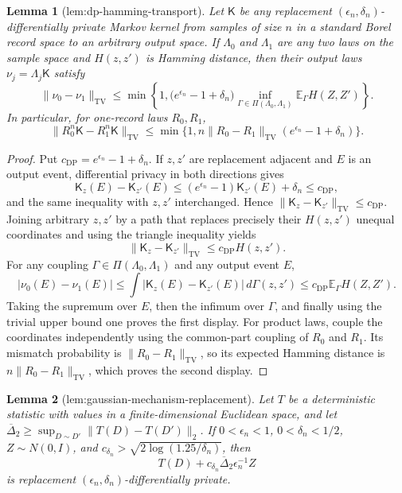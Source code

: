 \documentclass{article}
\newtheorem{lemma}{Lemma}
\begin{document}
\begin{lemma}[lem:dp-hamming-transport]\label{lem:dp-hamming-transport}
Let \(\mathsf K\) be any replacement \((\epsilon_n,\delta_n)\)-differentially private Markov kernel from samples of size \(n\) in a standard Borel record space to an arbitrary output space.  If \(\Lambda_0\) and \(\Lambda_1\) are any two laws on the sample space and \(H(z,z')\) is Hamming distance, then their output laws \(\nu_j=\Lambda_j\mathsf K\) satisfy
\[
 \|\nu_0-\nu_1\|_{\mathrm{TV}}
 \le \min\!\left\{1,\bigl(e^{\epsilon_n}-1+\delta_n\bigr)
 \inf_{\Gamma\in\Pi(\Lambda_0,\Lambda_1)}\mathbb E_\Gamma H(Z,Z')\right\}.
\]
In particular, for one-record laws \(R_0,R_1\),
\[
 \|R_0^n\mathsf K-R_1^n\mathsf K\|_{\mathrm{TV}}
 \le \min\{1,n\|R_0-R_1\|_{\mathrm{TV}}(e^{\epsilon_n}-1+\delta_n)\}.
\]
\end{lemma}
\begin{proof}
Put \(c_{\mathrm{DP}}=e^{\epsilon_n}-1+\delta_n\).  If \(z,z'\) are replacement adjacent and \(E\) is an output event, differential privacy in both directions gives
\[
 \mathsf K_z(E)-\mathsf K_{z'}(E)
 \le (e^{\epsilon_n}-1)\mathsf K_{z'}(E)+\delta_n
 \le c_{\mathrm{DP}},
\]
and the same inequality with \(z,z'\) interchanged.  Hence
\(\|\mathsf K_z-\mathsf K_{z'}\|_{\mathrm{TV}}\le c_{\mathrm{DP}}\).
Joining arbitrary \(z,z'\) by a path that replaces precisely their \(H(z,z')\) unequal coordinates and using the triangle inequality yields
\[
 \|\mathsf K_z-\mathsf K_{z'}\|_{\mathrm{TV}}
 \le c_{\mathrm{DP}}H(z,z').
\]
For any coupling \(\Gamma\in\Pi(\Lambda_0,\Lambda_1)\) and any output event \(E\),
\[
 |\nu_0(E)-\nu_1(E)|
 \le\int |\mathsf K_z(E)-\mathsf K_{z'}(E)|\,d\Gamma(z,z')
 \le c_{\mathrm{DP}}\mathbb E_\Gamma H(Z,Z').
\]
Taking the supremum over \(E\), then the infimum over \(\Gamma\), and finally using the trivial upper bound one proves the first display.  For product laws, couple the coordinates independently using the common-part coupling of \(R_0\) and \(R_1\).  Its mismatch probability is \(\|R_0-R_1\|_{\mathrm{TV}}\), so its expected Hamming distance is \(n\|R_0-R_1\|_{\mathrm{TV}}\), which proves the second display.
\end{proof}

\begin{lemma}[lem:gaussian-mechanism-replacement]\label{lem:gaussian-mechanism-replacement}
Let \(T\) be a deterministic statistic with values in a finite-dimensional Euclidean space, and let \(\overline\Delta_2\ge\sup_{D\sim D'}\lVert T(D)-T(D')\rVert_2\).  If \(0<\epsilon_n<1\), \(0<\delta_n<1/2\), \(Z\sim N(0,I)\), and \(c_{\delta_n}>\sqrt{2\log(1.25/\delta_n)}\), then
\[
 T(D)+c_{\delta_n}\overline\Delta_2\epsilon_n^{-1}Z
\]
is replacement \((\epsilon_n,\delta_n)\)-differentially private.
\end{lemma}
\end{document}
